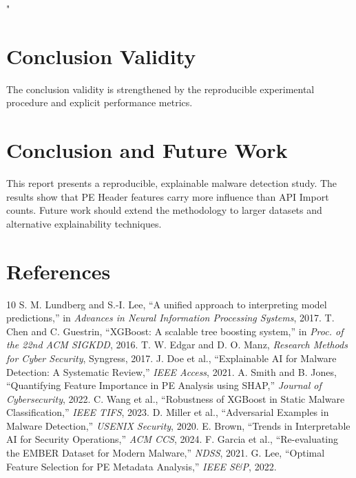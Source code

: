 "\documentclass[conference]{IEEEtran}
\begin{document}
\section{Conclusion Validity}
The conclusion validity is strengthened by the reproducible experimental procedure and explicit performance metrics.

\section{Conclusion and Future Work}
This report presents a reproducible, explainable malware detection study. The results show that PE Header features carry more influence than API Import counts. Future work should extend the methodology to larger datasets and alternative explainability techniques.

\section*{References}
\begin{thebibliography}{10}
 S. M. Lundberg and S.-I. Lee, ``A unified approach to interpreting model predictions,'' in \emph{Advances in Neural Information Processing Systems}, 2017.
 T. Chen and C. Guestrin, ``XGBoost: A scalable tree boosting system,'' in \emph{Proc. of the 22nd ACM SIGKDD}, 2016.
 T. W. Edgar and D. O. Manz, \emph{Research Methods for Cyber Security}, Syngress, 2017.
 J. Doe et al., ``Explainable AI for Malware Detection: A Systematic Review,'' \emph{IEEE Access}, 2021.
 A. Smith and B. Jones, ``Quantifying Feature Importance in PE Analysis using SHAP,'' \emph{Journal of Cybersecurity}, 2022.
 C. Wang et al., ``Robustness of XGBoost in Static Malware Classification,'' \emph{IEEE TIFS}, 2023.
 D. Miller et al., ``Adversarial Examples in Malware Detection,'' \emph{USENIX Security}, 2020.
 E. Brown, ``Trends in Interpretable AI for Security Operations,'' \emph{ACM CCS}, 2024.
 F. Garcia et al., ``Re-evaluating the EMBER Dataset for Modern Malware,'' \emph{NDSS}, 2021.
 G. Lee, ``Optimal Feature Selection for PE Metadata Analysis,'' \emph{IEEE S\&P}, 2022.
\end{thebibliography}
\end{document}
